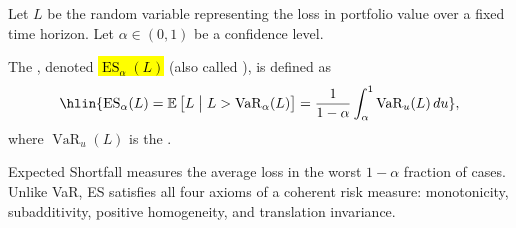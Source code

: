 \begin{definition} \label{definition:expected_shortfall_conditional_VaR_for_a_portfolio_loss}
Let $L$ be the random variable representing the loss in portfolio value over a fixed time horizon. Let $\alpha \in (0, 1)$ be a confidence level.

The , denoted \hl{$\operatorname{ES}_\alpha(L)$} (also called ), is defined as
$$\hlin{\operatorname{ES}_\alpha(L) = \mathbb{E}\left[L \;\big|\; L > \operatorname{VaR}_\alpha(L)\right] = \frac{1}{1 - \alpha} \int_\alpha^1 \operatorname{VaR}_u(L) \, du},$$
where $\operatorname{VaR}_u(L)$ is the .

Expected Shortfall measures the average loss in the worst $1 - \alpha$ fraction of cases. Unlike VaR, ES satisfies all four axioms of a coherent risk measure: monotonicity, subadditivity, positive homogeneity, and translation invariance.
\end{definition}
